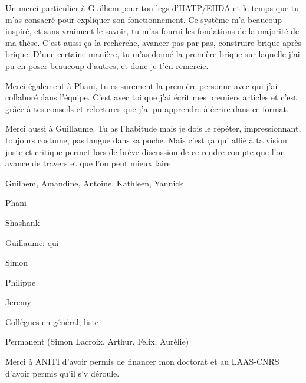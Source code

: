 Un merci particulier à Guilhem pour ton legs d'HATP/EHDA et le temps que tu m'as consacré pour expliquer son fonctionnement. 
Ce système m'a beaucoup inspiré, et sans vraiment le savoir, tu m'as fourni les fondations de la majorité de ma thèse. C'est aussi ça la recherche, avancer pas par pas, construire brique après brique. D'une certaine manière, tu m'as donné la première brique sur laquelle j'ai pu en poser beaucoup d'autres, et donc je t'en remercie.

Merci également à Phani, tu es surement la première personne avec qui j'ai collaboré dans l'équipe. C'est avec toi que j'ai écrit mes premiers articles et c'est grâce à tes conseils et relectures que j'ai pu apprendre à écrire dans ce format. 

Merci aussi à Guillaume. Tu as l'habitude mais je dois le répéter, impressionnant, toujours costume, pas langue dans sa poche. Mais c'est ça qui allié à ta vision juste et critique permet lors de brève discussion de ce rendre compte que l'on avance de travers et que l'on peut mieux faire.   

Guilhem, Amandine, Antoine, Kathleen, Yannick

Phani

Shashank

Guillaume: qui 

Simon

Philippe

Jeremy

Collègues en général, liste

Permanent (Simon Lacroix, Arthur, Felix, Aurélie)



Merci à ANITI d'avoir permis de financer mon doctorat et au LAAS-CNRS d'avoir permis qu'il s'y déroule.

